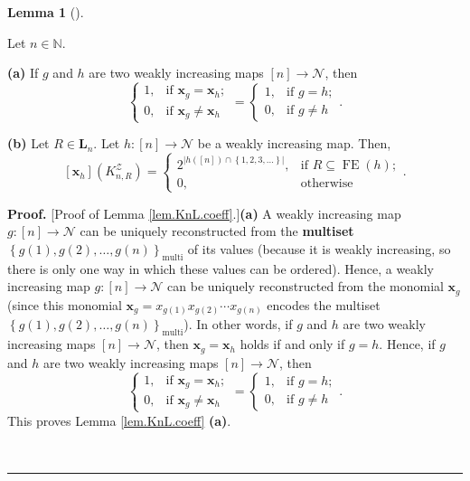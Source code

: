 \documentclass[numbers=enddot,12pt,final,onecolumn,notitlepage]{scrartcl}%
\theoremstyle{definition}
\newtheorem{lem}[theo]{Lemma}
\newenvironment{lemma}[1][]
{\begin{lem}[#1]\begin{leftbar}}
{\end{leftbar}\end{lem}}
\newenvironment{proof}[1][Proof]{\noindent\textbf{#1.} }{\ \rule{0.5em}{0.5em}}
\newenvironment{verlong}{}{}
\begin{document}
\begin{verlong}
\begin{lemma}
\label{lem.KnL.coeff}Let $n\in\mathbb{N}$.

\textbf{(a)} If $g$ and $h$ are two weakly increasing maps $\left[  n\right]
\rightarrow\mathcal{N}$, then
\[%
\begin{cases}
1, & \text{if }\mathbf{x}_{g}=\mathbf{x}_{h};\\
0, & \text{if }\mathbf{x}_{g}\neq\mathbf{x}_{h}%
\end{cases}
=%
\begin{cases}
1, & \text{if }g=h;\\
0, & \text{if }g\neq h
\end{cases}
.
\]


\textbf{(b)} Let $R\in\mathbf{L}_{n}$. Let $h:\left[  n\right]  \rightarrow
\mathcal{N}$ be a weakly increasing map. Then,%
\[
\left[  \mathbf{x}_{h}\right]  \left(  K_{n,R}^{\mathcal{Z}}\right)  =%
\begin{cases}
2^{\left\vert h\left(  \left[  n\right]  \right)  \cap\left\{  1,2,3,\ldots
\right\}  \right\vert }, & \text{if }R\subseteq\operatorname*{FE}\left(
h\right)  ;\\
0, & \text{otherwise}%
\end{cases}
.
\]

\end{lemma}

\begin{proof}
[Proof of Lemma \ref{lem.KnL.coeff}.]\textbf{(a)} A weakly increasing map
$g:\left[  n\right]  \rightarrow\mathcal{N}$ can be uniquely reconstructed
from the \textbf{multiset} $\left\{  g\left(  1\right)  ,g\left(  2\right)
,\ldots,g\left(  n\right)  \right\}  _{\operatorname*{multi}}$ of its values
(because it is weakly increasing, so there is only one way in which these
values can be ordered). Hence, a weakly increasing map $g:\left[  n\right]
\rightarrow\mathcal{N}$ can be uniquely reconstructed from the monomial
$\mathbf{x}_{g}$ (since this monomial
$\mathbf{x}_{g}=x_{g\left(1\right)}x_{g\left(2\right)}\cdots
x_{g\left(n\right)}$
encodes the multiset $\left\{  g\left(  1\right)  ,g\left(
2\right)  ,\ldots,g\left(  n\right)  \right\}  _{\operatorname*{multi}}$). In
other words, if $g$ and $h$ are two weakly increasing maps $\left[  n\right]
\rightarrow\mathcal{N}$, then $\mathbf{x}_{g}=\mathbf{x}_{h}$ holds if and
only if $g=h$. Hence, if $g$ and $h$ are two weakly increasing maps $\left[
n\right]  \rightarrow\mathcal{N}$, then
\[%
\begin{cases}
1, & \text{if }\mathbf{x}_{g}=\mathbf{x}_{h};\\
0, & \text{if }\mathbf{x}_{g}\neq\mathbf{x}_{h}%
\end{cases}
=%
\begin{cases}
1, & \text{if }g=h;\\
0, & \text{if }g\neq h
\end{cases}
.
\]
This proves Lemma \ref{lem.KnL.coeff} \textbf{(a)}.


\end{proof}
\end{verlong}
\end{document}
